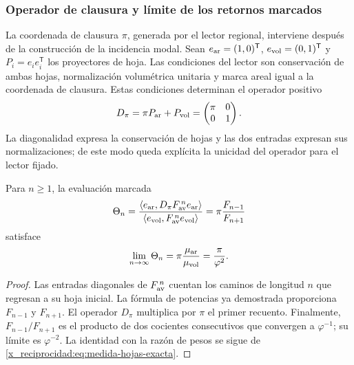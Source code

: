 \subsubsection{Operador de clausura y límite de los retornos marcados}
\label{x_reciprocidad:sec:operador-retorno-marcado}

La coordenada de clausura \(\pi\), generada por el lector regional,
interviene después de la construcción de la incidencia modal. Sean
\(e_{\rm ar}=(1,0)^{\mathsf T}\),
\(e_{\rm vol}=(0,1)^{\mathsf T}\) y
\(P_i=e_ie_i^{\mathsf T}\) los proyectores de hoja. Las condiciones
del lector son conservación de ambas hojas, normalización volumétrica
unitaria y marca areal igual a la coordenada de clausura. Estas condiciones
determinan el operador positivo
\begin{equation}
 D_\pi=\pi P_{\rm ar}+P_{\rm vol}
       =\begin{pmatrix}\pi&0\\0&1\end{pmatrix}.
 \label{x_reciprocidad:eq:operador-marca-pi}
\end{equation}
La diagonalidad expresa la conservación de hojas y las dos entradas
expresan sus normalizaciones; de este modo queda explícita la unicidad
del operador para el lector fijado.

\begin{proposition}
Para \(n\geq1\), la evaluación marcada
\begin{equation}
 \Theta_n=
 \frac{\langle e_{\rm ar},D_\pi F_{\rm av}^{\,n}e_{\rm ar}\rangle}
 {\langle e_{\rm vol},F_{\rm av}^{\,n}e_{\rm vol}\rangle}
 =\pi\frac{F_{n-1}}{F_{n+1}}
 \label{x_reciprocidad:eq:retorno-marcado-finito}
\end{equation}
satisface
\begin{equation}
 \lim_{n\to\infty}\Theta_n
 =\pi\frac{\mu_{\rm ar}}{\mu_{\rm vol}}
 =\frac{\pi}{\varphi^2}.
 \label{x_reciprocidad:eq:retorno-marcado-limite}
\end{equation}
\end{proposition}
\begin{proof}
Las entradas diagonales de \(F_{\rm av}^{\,n}\) cuentan los caminos
de longitud \(n\) que regresan a su hoja inicial. La fórmula de potencias
ya demostrada proporciona \(F_{n-1}\) y \(F_{n+1}\). El operador
\(D_\pi\) multiplica por \(\pi\) el primer recuento. Finalmente,
\(F_{n-1}/F_{n+1}\) es el producto de dos cocientes consecutivos
que convergen a \(\varphi^{-1}\); su límite es
\(\varphi^{-2}\). La identidad con la razón de pesos se sigue de
\eqref{x_reciprocidad:eq:medida-hojas-exacta}.
\end{proof}

